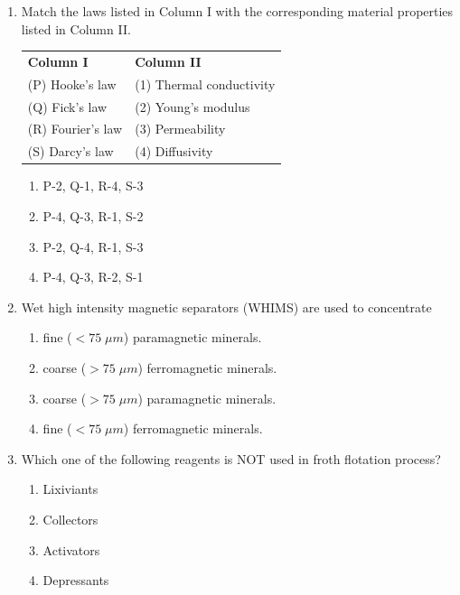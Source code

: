 \documentclass[journal]{IEEEtran}
\theoremstyle{remark}
\begin{document}
\begin{enumerate}[resume]
\item Match the laws listed in Column I with the corresponding material properties listed in Column II. \hfill{}
\begin{center}
\begin{tabularx}{0.8\textwidth}{lX}
\textbf{Column I} & \textbf{Column II} \\
(P) Hooke's law & (1) Thermal conductivity \\
(Q) Fick's law & (2) Young's modulus \\
(R) Fourier's law & (3) Permeability \\
(S) Darcy's law & (4) Diffusivity \\
\end{tabularx}
\end{center}
\begin{multicols}{2}
    

\begin{enumerate}
\item P-2, Q-1, R-4, S-3
\item P-4, Q-3, R-1, S-2
\item P-2, Q-4, R-1, S-3
\item P-4, Q-3, R-2, S-1
\end{enumerate}
\end{multicols}

\item Wet high intensity magnetic separators (WHIMS) are used to concentrate \hfill{}
\begin{enumerate}
\item fine ($< 75\; \mu m$) paramagnetic minerals.
\item coarse ($> 75\; \mu m$) ferromagnetic minerals.
\item coarse ($> 75\; \mu m$) paramagnetic minerals.
\item fine ($< 75\; \mu m$) ferromagnetic minerals.
\end{enumerate}

\item Which one of the following reagents is NOT used in froth flotation process? \hfill{}
\begin{multicols}{2}
\begin{enumerate}
\item Lixiviants
\item Collectors
\item Activators
\item Depressants
\end{enumerate}
\end{multicols}


\end{enumerate}
\end{document}
